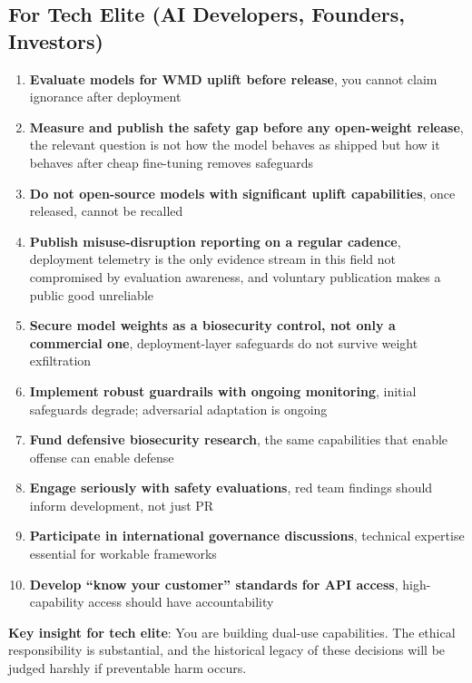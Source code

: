 \documentclass[11pt,letterpaper]{article}
\begin{document}
\subsection{For Tech Elite (AI Developers, Founders, Investors)}

\begin{contextbox}
\begin{enumerate}
  \item \textbf{Evaluate models for WMD uplift before release}, you cannot claim ignorance after deployment
  \item \textbf{Measure and publish the safety gap before any open-weight release}, the relevant question is not how the model behaves as shipped but how it behaves after cheap fine-tuning removes safeguards
  \item \textbf{Do not open-source models with significant uplift capabilities}, once released, cannot be recalled
  \item \textbf{Publish misuse-disruption reporting on a regular cadence}, deployment telemetry is the only evidence stream in this field not compromised by evaluation awareness, and voluntary publication makes a public good unreliable
  \item \textbf{Secure model weights as a biosecurity control, not only a commercial one}, deployment-layer safeguards do not survive weight exfiltration
  \item \textbf{Implement robust guardrails with ongoing monitoring}, initial safeguards degrade; adversarial adaptation is ongoing
  \item \textbf{Fund defensive biosecurity research}, the same capabilities that enable offense can enable defense
  \item \textbf{Engage seriously with safety evaluations}, red team findings should inform development, not just PR
  \item \textbf{Participate in international governance discussions}, technical expertise essential for workable frameworks
  \item \textbf{Develop ``know your customer'' standards for API access}, high-capability access should have accountability
\end{enumerate}

\textbf{Key insight for tech elite}: You are building dual-use capabilities. The ethical responsibility is substantial, and the historical legacy of these decisions will be judged harshly if preventable harm occurs.
\end{contextbox}
\end{document}
